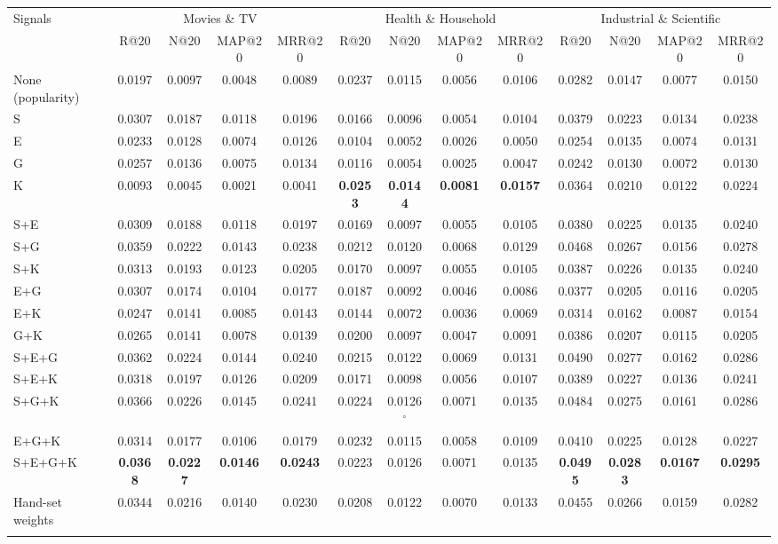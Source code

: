 \setlength{\tabcolsep}{3pt}
\begin{tabular*}{\hsize}{@{\extracolsep{\fill}}lcccccccccccc@{}}
\toprule
Signals & \multicolumn{4}{c}{Movies \& TV} & \multicolumn{4}{c}{Health \& Household} & \multicolumn{4}{c}{Industrial \& Scientific} \\
 & R@20 & N@20 & MAP@20 & MRR@20 & R@20 & N@20 & MAP@20 & MRR@20 & R@20 & N@20 & MAP@20 & MRR@20 \\
\colrule
None (popularity) & 0.0197 & 0.0097 & 0.0048 & 0.0089 & 0.0237 & 0.0115 & 0.0056 & 0.0106 & 0.0282 & 0.0147 & 0.0077 & 0.0150 \\
\colrule
S & 0.0307 & 0.0187 & 0.0118 & 0.0196 & 0.0166 & 0.0096 & 0.0054 & 0.0104 & 0.0379 & 0.0223 & 0.0134 & 0.0238 \\
E & 0.0233 & 0.0128 & 0.0074 & 0.0126 & 0.0104 & 0.0052 & 0.0026 & 0.0050 & 0.0254 & 0.0135 & 0.0074 & 0.0131 \\
G & 0.0257 & 0.0136 & 0.0075 & 0.0134 & 0.0116 & 0.0054 & 0.0025 & 0.0047 & 0.0242 & 0.0130 & 0.0072 & 0.0130 \\
K & 0.0093 & 0.0045 & 0.0021 & 0.0041 & \textbf{0.0253} & \textbf{0.0144} & \textbf{0.0081} & \textbf{0.0157} & 0.0364 & 0.0210 & 0.0122 & 0.0224 \\
\colrule
S+E & 0.0309 & 0.0188 & 0.0118 & 0.0197 & 0.0169 & 0.0097 & 0.0055 & 0.0105 & 0.0380 & 0.0225 & 0.0135 & 0.0240 \\
S+G & 0.0359 & 0.0222 & 0.0143 & 0.0238 & 0.0212 & 0.0120 & 0.0068 & 0.0129 & 0.0468 & 0.0267 & 0.0156 & 0.0278 \\
S+K & 0.0313 & 0.0193 & 0.0123 & 0.0205 & 0.0170 & 0.0097 & 0.0055 & 0.0105 & 0.0387 & 0.0226 & 0.0135 & 0.0240 \\
E+G & 0.0307 & 0.0174 & 0.0104 & 0.0177 & 0.0187 & 0.0092 & 0.0046 & 0.0086 & 0.0377 & 0.0205 & 0.0116 & 0.0205 \\
E+K & 0.0247 & 0.0141 & 0.0085 & 0.0143 & 0.0144 & 0.0072 & 0.0036 & 0.0069 & 0.0314 & 0.0162 & 0.0087 & 0.0154 \\
G+K & 0.0265 & 0.0141 & 0.0078 & 0.0139 & 0.0200 & 0.0097 & 0.0047 & 0.0091 & 0.0386 & 0.0207 & 0.0115 & 0.0205 \\
\colrule
S+E+G & 0.0362 & 0.0224 & 0.0144 & 0.0240 & 0.0215 & 0.0122 & 0.0069 & 0.0131 & 0.0490 & 0.0277 & 0.0162 & 0.0286 \\
S+E+K & 0.0318 & 0.0197 & 0.0126 & 0.0209 & 0.0171 & 0.0098 & 0.0056 & 0.0107 & 0.0389 & 0.0227 & 0.0136 & 0.0241 \\
S+G+K & 0.0366 & 0.0226 & 0.0145 & 0.0241 & 0.0224 & 0.0126$^{\circ}$ & 0.0071 & 0.0135 & 0.0484 & 0.0275 & 0.0161 & 0.0286 \\
E+G+K & 0.0314 & 0.0177 & 0.0106 & 0.0179 & 0.0232 & 0.0115 & 0.0058 & 0.0109 & 0.0410 & 0.0225 & 0.0128 & 0.0227 \\
\colrule
S+E+G+K & \textbf{0.0368} & \textbf{0.0227} & \textbf{0.0146} & \textbf{0.0243} & 0.0223 & 0.0126 & 0.0071 & 0.0135 & \textbf{0.0495} & \textbf{0.0283} & \textbf{0.0167} & \textbf{0.0295} \\
\colrule
Hand-set weights & 0.0344 & 0.0216 & 0.0140 & 0.0230 & 0.0208 & 0.0122 & 0.0070 & 0.0133 & 0.0455 & 0.0266 & 0.0159 & 0.0282 \\
\botrule
\end{tabular*}
